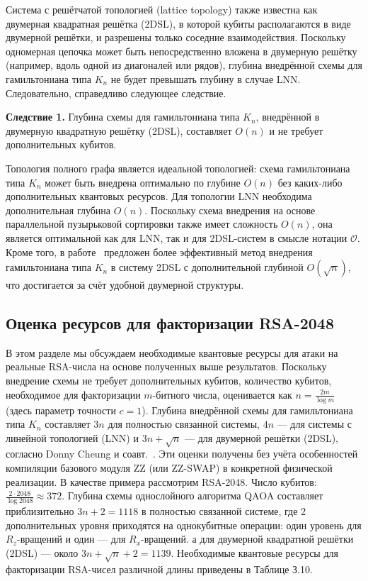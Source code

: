 Система с решётчатой топологией (lattice topology) также известна как двумерная
квадратная решётка (2DSL), в которой кубиты располагаются в виде двумерной
решётки, и разрешены только соседние взаимодействия. Поскольку одномерная
цепочка может быть непосредственно вложена в двумерную решётку (например, вдоль
одной из диагоналей или рядов), глубина внедрённой схемы для гамильтониана типа
$K_n$ не будет превышать глубину в случае LNN. Следовательно, справедливо
следующее следствие.

\textbf{Следствие 1.} Глубина схемы для гамильтониана типа $K_n$, внедрённой в
двумерную квадратную решётку (2DSL), составляет $O(n)$ и не требует
дополнительных кубитов.

Топология полного графа является идеальной топологией: схема гамильтониана типа
$K_n$ может быть внедрена оптимально по глубине $O(n)$ без каких-либо
дополнительных квантовых ресурсов. Для топологии LNN необходима дополнительная
глубина $O(n)$. Поскольку схема внедрения на основе параллельной пузырьковой
сортировки также имеет сложность $O(n)$, она является оптимальной как для LNN,
так и для 2DSL-систем в смысле нотации $\mathcal{O}$. Кроме того, в
работе~\cite{cite_55} предложен более эффективный метод внедрения гамильтониана
типа $K_n$ в систему 2DSL с дополнительной глубиной $O(\sqrt{n})$, что
достигается за счёт удобной двумерной структуры.

\subsection*{Оценка ресурсов для факторизации RSA-2048}

В этом разделе мы обсуждаем необходимые квантовые ресурсы для атаки на реальные
RSA-числа на основе полученных выше результатов. Поскольку внедрение схемы не
требует дополнительных кубитов, количество кубитов, необходимое для
факторизации $m$-битного числа, оценивается как $n = \frac{2m}{\log m}$ (здесь
параметр точности $c = 1$). Глубина внедрённой схемы для гамильтониана типа
$K_n$ составляет $3n$ для полностью связанной системы, $4n$ — для системы с
линейной топологией (LNN) и $3n + \sqrt{n}$ — для двумерной решётки (2DSL),
согласно Donny Cheung и соавт.~\cite{cite_55}. Эти оценки получены без учёта
особенностей компиляции базового модуля ZZ (или ZZ-SWAP) в конкретной
физической реализации. В качестве примера рассмотрим RSA-2048. Число кубитов:
$\frac{2 \cdot 2048}{\log 2048} \approx 372$. Глубина схемы однослойного
алгоритма QAOA составляет приблизительно $3n + 2 = 1118$ в полностью связанной
системе, где 2 дополнительных уровня приходятся на однокубитные операции: один
уровень для $R_z$-вращений и один — для $R_x$-вращений. а для двумерной
квадратной решётки (2DSL) — около $3n + \sqrt{n} + 2 = 1139$. Необходимые
квантовые ресурсы для факторизации RSA-чисел различной длины приведены в
Таблице З.10.

